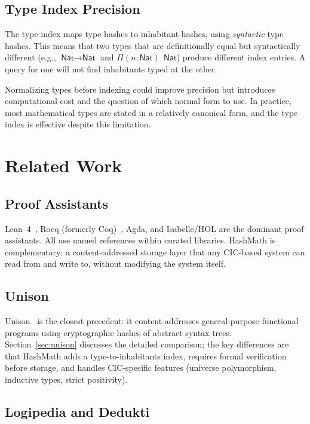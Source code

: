 \documentclass[11pt]{article}
\theoremstyle{definition}
\theoremstyle{plain}
\theoremstyle{remark}
\newcommand{\Nat}{\textsf{Nat}}
\begin{document}
\subsection{Type Index Precision}
\label{sec:index-precision}

The type index maps type hashes to inhabitant hashes, using \emph{syntactic} type hashes.
This means that two types that are definitionally equal but syntactically different
(e.g., $\Nat \to \Nat$ and $\Pi(n{:}\Nat).\,\Nat$) produce different index entries.
A query for one will not find inhabitants typed at the other.

Normalizing types before indexing could improve precision but introduces computational cost
and the question of which normal form to use.
In practice, most mathematical types are stated in a relatively canonical form, and
the type index is effective despite this limitation.


\section{Related Work}
\label{sec:related}

\subsection{Proof Assistants}

Lean~4~\cite{lean4}, Rocq (formerly Coq)~\cite{coquand1988}, Agda, and Isabelle/HOL
are the dominant proof assistants.
All use named references within curated libraries.
HashMath is complementary: a content-addressed storage layer that any CIC-based system can
read from and write to, without modifying the system itself.

\subsection{Unison}

Unison~\cite{unison} is the closest precedent: it content-addresses general-purpose functional
programs using cryptographic hashes of abstract syntax trees.
Section~\ref{sec:unison} discusses the detailed comparison; the key differences are that
HashMath adds a type-to-inhabitants index, requires formal verification before storage,
and handles CIC-specific features (universe polymorphism, inductive types, strict positivity).

\subsection{Logipedia and Dedukti}
\end{document}
